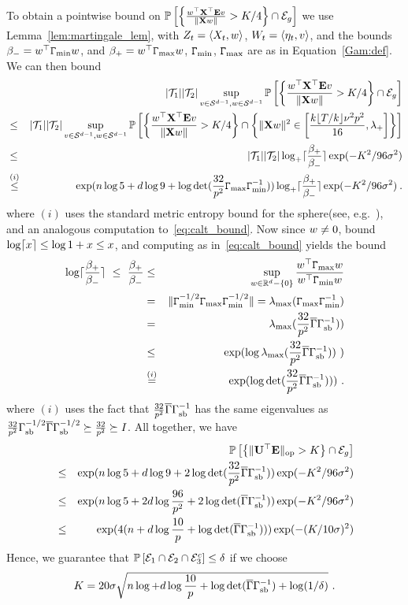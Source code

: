 To obtain a pointwise bound on $\mathbb{P}\left[\left\{\frac{w^{\top}\mathbf{X}^{\top} \mathbf{E} v }{\|\mathbf{X} w\|} > K/4\right\} \cap \mathcal{E}_g\right]$ we use Lemma~\ref{lem:martingale_lem}, with $Z_t = \langle X_t, w \rangle$, 
$W_t = \langle \eta_t, v \rangle$, and the bounds $\beta_- = w^\top \mathtt{\Gamma}_{\min} w$, and $\beta_+ = w^\top \mathtt{\Gamma}_{\max} w$, $\mathtt{\Gamma}_{\min}$, $\mathtt{\Gamma}_{\max}$ are as in Equation~\eqref{Gam:def}. We can then bound
\begin{eqnarray*}
&&|\mathcal{T}_1||\mathcal{T}_2|\sup_{v \in \mathcal{S}^{d-1},w \in \mathcal{S}^{d-1}}\mathbb{P}\left[\left\{\frac{w^{\top}\mathbf{X}^{\top} \mathbf{E} v }{\|\mathbf{X} w\|} > K/4\right\} \cap \mathcal{E}_g\right] \\
&\le& |\mathcal{T}_1||\mathcal{T}_2|\sup_{v \in \mathcal{S}^{d-1},w \in \mathcal{S}^{d-1}}\mathbb{P}\left[\left\{\frac{w^\top \mathbf{X}^\top \mathbf{E} v}{\|\mathbf{X} w\|} > K/4\right\} \cap \left\{ \|\mathbf{X} w\|^2 \in \left[\frac{k\lfloor T/k\rfloor \nu^2 p^2}{16},\lambda_{+} \right]\right\}\right] \\
&\le& |\mathcal{T}_1||\mathcal{T}_2| \log_+ \lceil\frac{\beta_+}{\beta_-}\rceil \exp(-K^2 / 96 \sigma^2 )\\
&\overset{(i)}{\le}& \exp( n \log 5 + d\log 9 + \log \det(\frac{32}{p^2}\mathtt{\Gamma}_{\max}\mathtt{\Gamma}_{\min}^{-1}))  \log_+ \lceil\frac{\beta_+}{\beta_-}\rceil \exp(-K^2 / 96\sigma^2 ) \:.
\end{eqnarray*}
where $(i)$ uses the standard metric entropy bound for the sphere(see, e.g.~\cite{vershynin11}), and an analogous computation to~\eqref{eq:calt_bound}.
Now since $w \ne 0$, bound $\log \lceil x\rceil \le \log 1 + x \le x$, and computing as in~\eqref{eq:calt_bound} yields the bound
\begin{eqnarray*}
\log\lceil\frac{\beta_+}{\beta_-}\rceil ~\le~\frac{\beta_+}{\beta_-} &\le&  \sup_{w \in \mathbb{R}^d - \{0\}} \frac{w^\top \mathtt{\Gamma}_{\max} w}{w^\top \mathtt{\Gamma}_{\min} w} \\
&=& \|\mathtt{\Gamma}_{\min}^{-1/2}\mathtt{\Gamma}_{\max}\mathtt{\Gamma}_{\min}^{-1/2}\| = \lambda_{\max}(\mathtt{\Gamma}_{\max} \mathtt{\Gamma}_{\min}^{-1})\\
&=& \lambda_{\max}(\frac{32}{p^2}\overline{\Gamma}\Gamma_{\mathrm{sb}}^{-1}))\\
&\le& \exp( \log \lambda_{\max}(\frac{32}{p^2}\overline{\Gamma}\Gamma_{\mathrm{sb}}^{-1}))~)\\
&\overset{(i)}{=}& \exp( \log \det(\frac{32}{p^2}\overline{\Gamma}\Gamma_{\mathrm{sb}}^{-1})))~.
\end{eqnarray*}
where $(i)$ uses the fact that $\frac{32}{p^2}\overline{\Gamma}\Gamma_{\mathrm{sb}}^{-1}$ has the same eigenvalues as $\frac{32}{p^2}\Gamma_{\mathrm{sb}}^{-1/2}\overline{\Gamma}\Gamma_{\mathrm{sb}}^{-1/2} \succeq \frac{32}{p^2} \succeq I$.  All together, we have
\begin{eqnarray*}
&&\mathbb{P}\left[\left\{\lVert \mathbf{U}^\top \mathbf{E} \rVert_{\mathrm{op}} > K\right\} \cap \mathcal{E}_g\right]\\ &\le& \exp( n \log 5 + d\log 9 + 2\log \det(\frac{32}{p^2}\overline{\Gamma}\Gamma_{\mathrm{sb}}^{-1}))\exp(-K^2 / 96\sigma^2 ) \\
&\le& \exp( n \log 5 + 2d\log \frac{96}{p^2} + 2\log \det(\overline{\Gamma}\Gamma_{\mathrm{sb}}^{-1}))\exp(-K^2 / 96\sigma^2 ) \\
&\le& \exp( 4(n + d\log \frac{10}{p} + \log \det(\overline{\Gamma}\Gamma_{\mathrm{sb}}^{-1})))\exp(- (K/10\sigma)^2) 
\end{eqnarray*}
Hence, we guarantee that $\mathbb{P}\left[ \mathcal{E}_1 \cap \mathcal{E}_2 \cap \mathcal{E}_3^c \right] \leq \delta $ if we choose
\begin{eqnarray*}
K = 20\sigma \sqrt{n \log  + d\log \frac{10}{p} + \log \det(\overline{\Gamma}\Gamma_{\mathrm{sb}}^{-1}) + \log(1/\delta) }~.
\end{eqnarray*}

